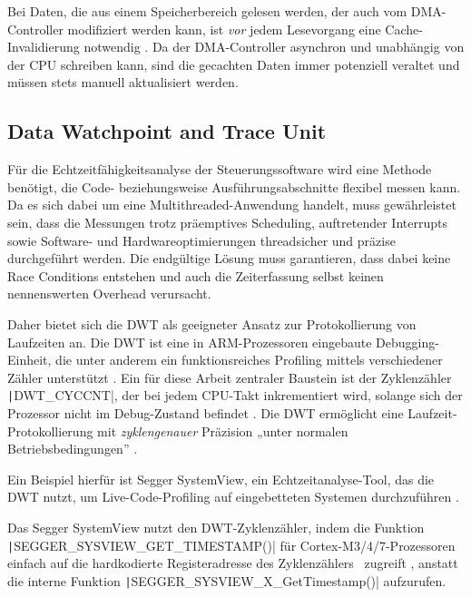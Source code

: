 Bei Daten, die aus einem Speicherbereich gelesen werden, der auch vom
DMA-Controller modifiziert werden kann, ist \textit{vor} jedem Lesevorgang eine
Cache-Invalidierung notwendig \cite{embeddedexpert_cache}. Da der DMA-Controller
asynchron und unabhängig von der CPU schreiben kann, sind die gecachten Daten
immer potenziell veraltet und müssen stets manuell aktualisiert werden.

\subsection{Data Watchpoint and Trace Unit} \label{sec:dwt}

Für die Echtzeitfähigkeitsanalyse der Steuerungssoftware wird eine Methode
benötigt, die Code- beziehungsweise Ausführungsabschnitte flexibel messen kann.
Da es sich dabei um eine Multithreaded-Anwendung handelt, muss gewährleistet sein,
dass die Messungen trotz präemptives Scheduling, auftretender Interrupts sowie
Software- und Hardwareoptimierungen threadsicher und präzise durchgeführt
werden. Die endgültige Lösung muss garantieren, dass dabei keine Race Conditions
entstehen und auch die Zeiterfassung selbst keinen nennenswerten Overhead
verursacht.

Daher bietet sich die DWT als geeigneter Ansatz zur Protokollierung von
Laufzeiten an. Die DWT ist eine in ARM-Prozessoren eingebaute Debugging-Einheit,
die unter anderem ein funktionsreiches Profiling mittels verschiedener Zähler
unterstützt \cite{ARMv7_ref_man_dwt_profiling}. Ein für diese Arbeit zentraler
Baustein ist der Zyklenzähler \texttt|DWT_CYCCNT|, der bei jedem CPU-Takt
inkrementiert wird, solange sich der Prozessor nicht im Debug-Zustand befindet
\cite{ARMv7_ref_man_dwt_cycle}. Die DWT ermöglicht eine Laufzeit-Protokollierung
mit \textit{zyklengenauer} Präzision „unter normalen Betriebsbedingungen”
\cite{ARMv7_ref_man_dwt_profiling}.

Ein Beispiel hierfür ist Segger SystemView, ein Echtzeitanalyse-Tool, das die
DWT nutzt, um Live-Code-Profiling auf eingebetteten Systemen durchzuführen
\cite{SEGGER_SystemView}.

Das Segger SystemView nutzt den DWT-Zyklenzähler, indem die Funktion \linebreak
\texttt|SEGGER_SYSVIEW_GET_TIMESTAMP()| für Cortex-M3/4/7-Prozessoren
einfach auf die hardkodierte Registeradresse des
Zyklenzählers~\cite{Arm_DWT_Programmers_Model} zugreift \cite[S.
65]{Segger_SystemView_manual}, anstatt die interne Funktion
\texttt|SEGGER_SYSVIEW_X_GetTimestamp()| aufzurufen.
